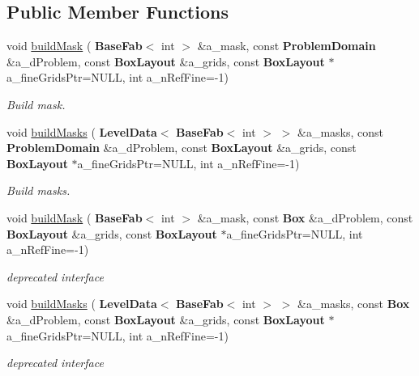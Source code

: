 \subsection*{Public Member Functions}
\begin{DoxyCompactItemize}
\item 
\mbox{\label{class_mask_ab1652414426159d30e756e1da3a8932c}} 
void \hyperlink{class_mask_ab1652414426159d30e756e1da3a8932c}{build\+Mask} (\textbf{ Base\+Fab}$<$ int $>$ \&a\+\_\+mask, const \textbf{ Problem\+Domain} \&a\+\_\+d\+Problem, const \textbf{ Box\+Layout} \&a\+\_\+grids, const \textbf{ Box\+Layout} $\ast$a\+\_\+fine\+Grids\+Ptr=N\+U\+LL, int a\+\_\+n\+Ref\+Fine=-\/1)
\begin{DoxyCompactList}\small\item\em Build mask. \end{DoxyCompactList}\item 
\mbox{\label{class_mask_a2d53aed5c96ff103c2b54955a134c5af}} 
void \hyperlink{class_mask_a2d53aed5c96ff103c2b54955a134c5af}{build\+Masks} (\textbf{ Level\+Data}$<$ \textbf{ Base\+Fab}$<$ int $>$ $>$ \&a\+\_\+masks, const \textbf{ Problem\+Domain} \&a\+\_\+d\+Problem, const \textbf{ Box\+Layout} \&a\+\_\+grids, const \textbf{ Box\+Layout} $\ast$a\+\_\+fine\+Grids\+Ptr=N\+U\+LL, int a\+\_\+n\+Ref\+Fine=-\/1)
\begin{DoxyCompactList}\small\item\em Build masks. \end{DoxyCompactList}\item 
\mbox{\label{class_mask_a5df266dd84059e03b3e1e139c98c6c66}} 
void \hyperlink{class_mask_a5df266dd84059e03b3e1e139c98c6c66}{build\+Mask} (\textbf{ Base\+Fab}$<$ int $>$ \&a\+\_\+mask, const \textbf{ Box} \&a\+\_\+d\+Problem, const \textbf{ Box\+Layout} \&a\+\_\+grids, const \textbf{ Box\+Layout} $\ast$a\+\_\+fine\+Grids\+Ptr=N\+U\+LL, int a\+\_\+n\+Ref\+Fine=-\/1)
\begin{DoxyCompactList}\small\item\em deprecated interface \end{DoxyCompactList}\item 
\mbox{\label{class_mask_ac62bddb04af6dbbe798a870a1e86c01c}} 
void \hyperlink{class_mask_ac62bddb04af6dbbe798a870a1e86c01c}{build\+Masks} (\textbf{ Level\+Data}$<$ \textbf{ Base\+Fab}$<$ int $>$ $>$ \&a\+\_\+masks, const \textbf{ Box} \&a\+\_\+d\+Problem, const \textbf{ Box\+Layout} \&a\+\_\+grids, const \textbf{ Box\+Layout} $\ast$a\+\_\+fine\+Grids\+Ptr=N\+U\+LL, int a\+\_\+n\+Ref\+Fine=-\/1)
\begin{DoxyCompactList}\small\item\em deprecated interface \end{DoxyCompactList}\end{DoxyCompactItemize}


